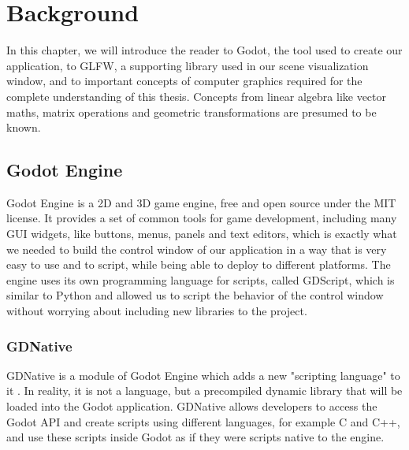 \chapter{Background}


In this chapter, we will introduce the reader to Godot, the tool used to create our application, to GLFW, a supporting library used in our scene visualization window, and to important concepts of computer graphics required for the complete understanding of this thesis. Concepts from linear algebra like vector maths, matrix operations and geometric transformations are presumed to be known.

\section{Godot Engine}
Godot Engine is a 2D and 3D game engine, free and open source under the MIT license. It provides a set of common tools for game development, including many GUI widgets, like buttons, menus, panels and text editors, which is exactly what we needed to build the control window of our application in a way that is very easy to use and to script, while being able to deploy to different platforms. The engine uses its own programming language for scripts, called GDScript, which is similar to Python and allowed us to script the behavior of the control window without worrying about including new libraries to the project.

\subsection{GDNative}
GDNative is a module of Godot Engine which adds a new "scripting language" to it \cite{gdnative_post}. In reality, it is not a language, but a precompiled dynamic library that will be loaded into the Godot application. GDNative allows developers to access the Godot API and create scripts using different languages, for example C and C++,  and use these scripts inside Godot as if they were scripts native to the engine.

